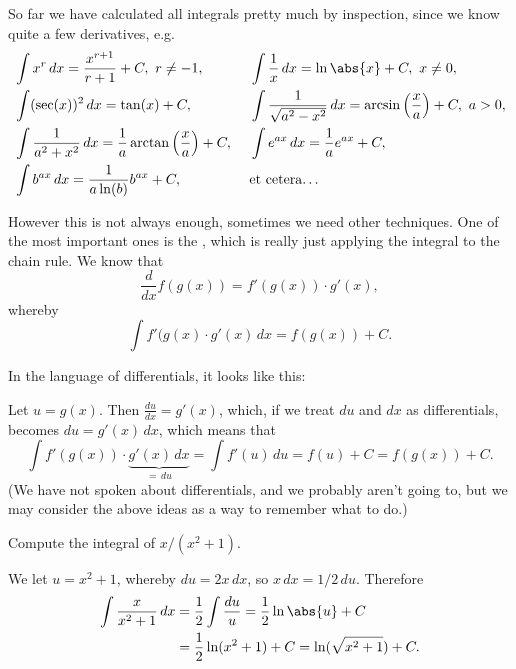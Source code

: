 
So far we have calculated all integrals pretty much by inspection, since we know quite a few derivatives, e.g.
\begin{alignat*}{2}
	  & \int x^r \, d x = \frac{x^{r + 1}}{r + 1} + C, ~r \neq -1, ~                          &   & \int \frac{1}{x} \, d x = \ln\abs{x} + C, ~x \neq 0,                                   \\
	  & \int (\sec(x))^2 \, d x = \tan(x) + C, ~                                              &   & \int \frac{1}{\sqrt{a^2 - x^2}} \, d x = \arcsin\Big ( \frac{x}{a} \Big ) + C, ~a > 0, \\
	  & \int \frac{1}{a^2 + x^2} \, d x = \frac{1}{a} \arctan\Big ( \frac{x}{a} \Big ) + C, ~ &   & \int e^{a x} \, d x = \frac{1}{a} e^{a x} + C,                                         \\
	  & \int b^{a x} \, d x = \frac{1}{a \ln(b)} b^{a x} + C, ~                               &   & \text{et cetera\ldots}
\end{alignat*}

\noindent
However this is not always enough, sometimes we need other techniques. One of the most important ones is the , which is really just applying the integral to the chain rule. We know that
\[
	\frac{d}{d x} f(g(x)) = f'(g(x)) \cdot g'(x),
\]
whereby
\[
	\int f'(g(x) \cdot g'(x) \, d x = f(g(x)) + C.
\]

\noindent
In the language of differentials, it looks like this:

Let $u = g(x)$. Then $\frac{d u}{d x} = g'(x)$, which, if we treat $d u$ and $d x$ as differentials, becomes $d u = g'(x) \, d x$, which means that
\[
	\int f'(g(x)) \cdot \underbrace{g'(x) \, d x}_{=\, d u} = \int f'(u) \, d u = f(u) + C = f(g(x)) + C.
\]
(We have not spoken about differentials, and we probably aren't going to, but we may consider the above ideas as a way to remember what to do.)

\begin{example}
	Compute the integral of $x / (x^2 + 1)$.

	We let $u = x^2 + 1$, whereby $d u = 2 x \, d x$, so $x \, d x = 1/2 \, d u$. Therefore
	\begin{align*}
		\int \frac{x}{x^2 + 1} \, d x & = \frac{1}{2} \int \frac{d u}{u} = \frac{1}{2} \ln\abs{u} + C \\
		                              & = \frac{1}{2} \ln(x^2 + 1) + C = \ln(\sqrt{x^2 + 1}) + C.
	\end{align*}
\end{example}

